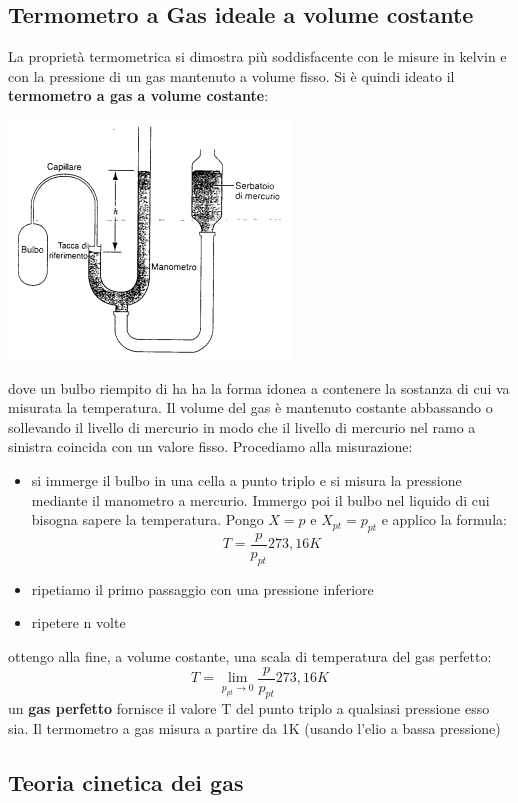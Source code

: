 \documentclass[a4paper,12pt, oneside]{book}
\begin{document}
\subsection{Termometro a Gas ideale a volume costante}
La proprietà termometrica si dimostra più soddisfacente con le misure in kelvin e con la pressione di un gas mantenuto a volume fisso. Si è quindi ideato il \textbf{termometro a gas a volume costante}:
\begin{center}
\includegraphics[scale=0.5]{img/term.png}
\end{center}
dove un bulbo riempito di ha ha la forma idonea a contenere la sostanza di cui va misurata la temperatura. Il volume del gas è mantenuto costante abbassando o sollevando il livello di mercurio in modo che il livello di mercurio nel ramo a sinistra coincida con un valore fisso. Procediamo alla misurazione:
\begin{itemize}
\item si immerge il bulbo in una cella a punto triplo e si misura la pressione mediante il manometro a mercurio. Immergo poi il bulbo nel liquido di cui bisogna sapere la temperatura. Pongo $X=p$ e $X_{pt}=p_{pt}$ e applico la formula:
$$T=\frac{p}{p_{pt}}273,16K$$
\item ripetiamo il primo passaggio con una pressione inferiore
\item ripetere n volte
\end{itemize}
ottengo alla fine, a volume costante, una scala di temperatura del gas perfetto:
$$T=\lim_{p_{pt}\to 0}\frac{p}{p_{pt}}273,16K$$
un \textbf{gas perfetto} fornisce il valore T del punto triplo a qualsiasi pressione esso sia. Il termometro a gas misura a partire da 1K (usando l'elio a bassa pressione)
\subsection{Teoria cinetica dei gas}
\end{document}

